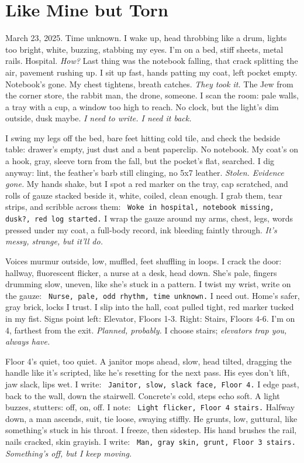 \documentclass[12pt]{article}
\newcommand{\note}[1]{\texttt{\small \color{DarkGray} #1}}
\begin{document}
\section{Like Mine but Torn}

March 23, 2025. Time unknown. I wake up, head throbbing like a drum, lights too bright, white, buzzing, stabbing my eyes. I’m on a bed, stiff sheets, metal rails. Hospital. \textit{How?} Last thing was the notebook falling, that crack splitting the air, pavement rushing up. I sit up fast, hands patting my coat, left pocket empty. Notebook’s gone. My chest tightens, breath catches. \textit{They took it.} The Jew from the corner store, the rabbit man, the drone, someone. I scan the room: pale walls, a tray with a cup, a window too high to reach. No clock, but the light’s dim outside, dusk maybe. \textit{I need to write. I need it back.}

I swing my legs off the bed, bare feet hitting cold tile, and check the bedside table: drawer’s empty, just dust and a bent paperclip. No notebook. My coat’s on a hook, gray, sleeve torn from the fall, but the pocket’s flat, searched. I dig anyway: lint, the feather’s barb still clinging, no 5x7 leather. \textit{Stolen. Evidence gone.} My hands shake, but I spot a red marker on the tray, cap scratched, and rolls of gauze stacked beside it, white, coiled, clean enough. I grab them, tear strips, and scribble across them: \note{Woke in hospital, notebook missing, dusk?, red log started.} I wrap the gauze around my arms, chest, legs, words pressed under my coat, a full-body record, ink bleeding faintly through. \textit{It’s messy, strange, but it’ll do.}

Voices murmur outside, low, muffled, feet shuffling in loops. I crack the door: hallway, fluorescent flicker, a nurse at a desk, head down. She’s pale, fingers drumming slow, uneven, like she’s stuck in a pattern. I twist my wrist, write on the gauze: \note{Nurse, pale, odd rhythm, time unknown.} I need out. Home’s safer, gray brick, locks I trust. I slip into the hall, coat pulled tight, red marker tucked in my fist. Signs point left: Elevator, Floors 1-3. Right: Stairs, Floors 4-6. I’m on 4, farthest from the exit. \textit{Planned, probably.} I choose stairs; \textit{elevators trap you, always have.}

Floor 4’s quiet, too quiet. A janitor mops ahead, slow, head tilted, dragging the handle like it’s scripted, like he’s resetting for the next pass. His eyes don’t lift, jaw slack, lips wet. I write: \note{Janitor, slow, slack face, Floor 4.} I edge past, back to the wall, down the stairwell. Concrete’s cold, steps echo soft. A light buzzes, stutters: off, on, off. I note: \note{Light flicker, Floor 4 stairs.} Halfway down, a man ascends, suit, tie loose, swaying stiffly. He grunts, low, guttural, like something’s stuck in his throat. I freeze, then sidestep. His hand brushes the rail, nails cracked, skin grayish. I write: \note{Man, gray skin, grunt, Floor 3 stairs.} \textit{Something’s off, but I keep moving.}
\end{document}
